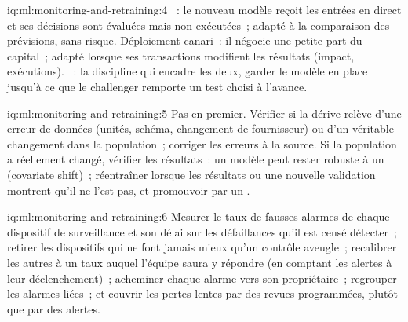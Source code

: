 \begin{solution}{iq:ml:monitoring-and-retraining:4}
~: le nouveau modèle reçoit les entrées en direct et ses décisions sont évaluées mais non exécutées~; adapté à la comparaison des prévisions, sans risque.
Déploiement canari~: il négocie une petite part du capital~; adapté lorsque ses transactions modifient les résultats (impact, exécutions). ~: la
discipline qui encadre les deux, garder le modèle en place jusqu'à ce que le challenger remporte un test choisi à l'avance.
\end{solution}

\begin{solution}{iq:ml:monitoring-and-retraining:5}
Pas en premier. Vérifier si la dérive relève d'une erreur de données (unités, schéma, changement de fournisseur) ou d'un véritable changement dans la population~; corriger les
erreurs à la source. Si la population a réellement changé, vérifier les résultats~: un modèle peut rester robuste à un  (covariate shift)~; réentraîner
lorsque les résultats ou une nouvelle validation montrent qu'il ne l'est pas, et promouvoir par un .
\end{solution}

\begin{solution}{iq:ml:monitoring-and-retraining:6}
Mesurer le taux de fausses alarmes de chaque dispositif de surveillance et son délai sur les défaillances qu'il est censé détecter~; retirer les dispositifs qui ne font jamais mieux qu'un contrôle aveugle~;
recalibrer les autres à un taux auquel l'équipe saura y répondre (en comptant les alertes à leur déclenchement)~; acheminer chaque alarme vers son propriétaire~; regrouper les alarmes liées~;
et couvrir les pertes lentes par des revues programmées, plutôt que par des alertes.
\end{solution}
